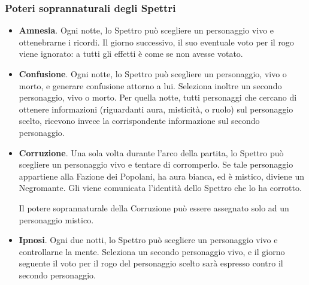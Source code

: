 \documentclass[a4paper,10pt]{article}
\begin{document}
\subsubsection*{Poteri soprannaturali degli Spettri}

\begin{itemize}

	\item {\bf Amnesia}. Ogni notte, lo Spettro può scegliere un personaggio vivo e ottenebrarne i ricordi. Il giorno successivo, il suo eventuale voto per il rogo viene ignorato: a tutti gli effetti è come se non avesse votato.
	
 
	\item {\bf Confusione}. Ogni notte, lo Spettro può scegliere un personaggio, vivo o morto, e generare confusione attorno a lui. Seleziona inoltre un secondo personaggio, vivo o morto. Per quella notte, tutti personaggi che cercano di ottenere informazioni (riguardanti aura, misticità, o ruolo) sul personaggio scelto, ricevono invece la corrispondente informazione sul secondo personaggio.
 
	\item {\bf Corruzione}. Una sola volta durante l'arco della partita, lo Spettro può scegliere un personaggio vivo e tentare di corromperlo. Se tale personaggio appartiene alla Fazione dei Popolani, ha aura bianca, ed è mistico, diviene un Negromante. Gli viene comunicata l'identità dello Spettro che lo ha corrotto.
 
	Il potere soprannaturale della Corruzione può essere assegnato solo ad un personaggio mistico.
 
	\item{\bf Ipnosi}. Ogni due notti, lo Spettro può scegliere un personaggio vivo e controllarne la mente. Seleziona un secondo personaggio vivo, e il giorno seguente il voto per il rogo del personaggio scelto sarà espresso contro il secondo personaggio.
	


\end{itemize}
\end{document}
